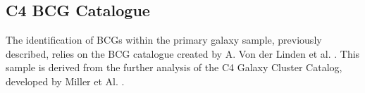 \subsection{C4 BCG Catalogue}
The identification of BCGs within the primary galaxy sample, previously described, relies on the BCG catalogue created by A. Von der Linden et al. \cite{2007MNRAS.379..867V, 2009yCat..73790867V}. This sample is derived from the further analysis of the C4 Galaxy Cluster Catalog,  developed by Miller et Al.  \cite{2005AJ....130..968M}.

